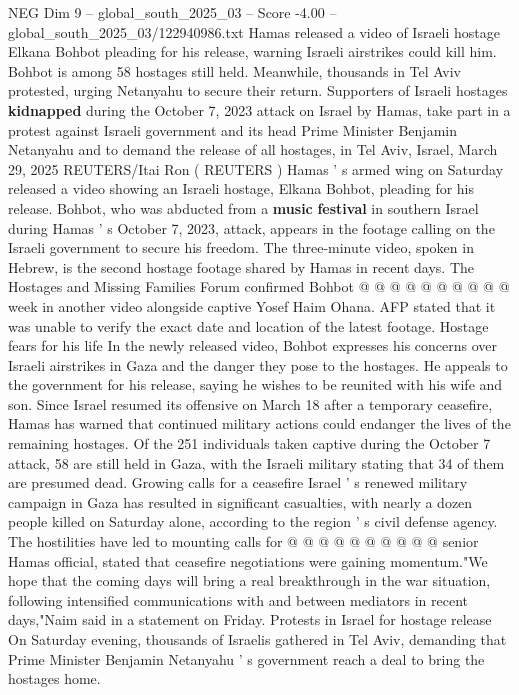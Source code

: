 \begin{textsample}{NEG Dim 9 – global\_south\_2025\_03 – Score -4.00 – global\_south\_2025\_03/122940986.txt}  \label{ex:f9_neg_399}
Hamas released a video of Israeli hostage Elkana Bohbot pleading for his release, warning Israeli airstrikes could kill him.
Bohbot is among 58 hostages still held.
Meanwhile, thousands in Tel Aviv protested, urging Netanyahu to secure their return.
Supporters of Israeli hostages \textbf{kidnapped} during the October 7, 2023 attack on Israel by Hamas, take part in a protest against Israeli government and its head Prime Minister Benjamin Netanyahu and to demand the release of all hostages, in Tel Aviv, Israel, March 29, 2025 REUTERS/Itai Ron ( REUTERS ) Hamas ' s armed wing on Saturday released a video showing an Israeli hostage, Elkana Bohbot, pleading for his release.
Bohbot, who was abducted from a \textbf{music} \textbf{festival} in southern Israel during Hamas ' s October 7, 2023, attack, appears in the footage calling on the Israeli government to secure his freedom.
The three-minute video, spoken in Hebrew, is the second hostage footage shared by Hamas in recent days.
The Hostages and Missing Families Forum confirmed Bohbot @ @ @ @ @ @ @ @ @ @ week in another video alongside captive Yosef Haim Ohana.
AFP stated that it was unable to verify the exact date and location of the latest footage.
Hostage fears for his life In the newly released video, Bohbot expresses his concerns over Israeli airstrikes in Gaza and the danger they pose to the hostages.
He appeals to the government for his release, saying he wishes to be reunited with his wife and son.
Since Israel resumed its offensive on March 18 after a temporary ceasefire, Hamas has warned that continued military actions could endanger the lives of the remaining hostages.
Of the 251 individuals taken captive during the October 7 attack, 58 are still held in Gaza, with the Israeli military stating that 34 of them are presumed dead.
Growing calls for a ceasefire Israel ' s renewed military campaign in Gaza has resulted in significant casualties, with nearly a dozen people killed on Saturday alone, according to the region ' s civil defense agency.
The hostilities have led to mounting calls for @ @ @ @ @ @ @ @ @ @ senior Hamas official, stated that ceasefire negotiations were gaining momentum."We hope that the coming days will bring a real breakthrough in the war situation, following intensified communications with and between mediators in recent days,"Naim said in a statement on Friday.
Protests in Israel for hostage release On Saturday evening, thousands of Israelis gathered in Tel Aviv, demanding that Prime Minister Benjamin Netanyahu ' s government reach a deal to bring the hostages home.

\end{textsample}
